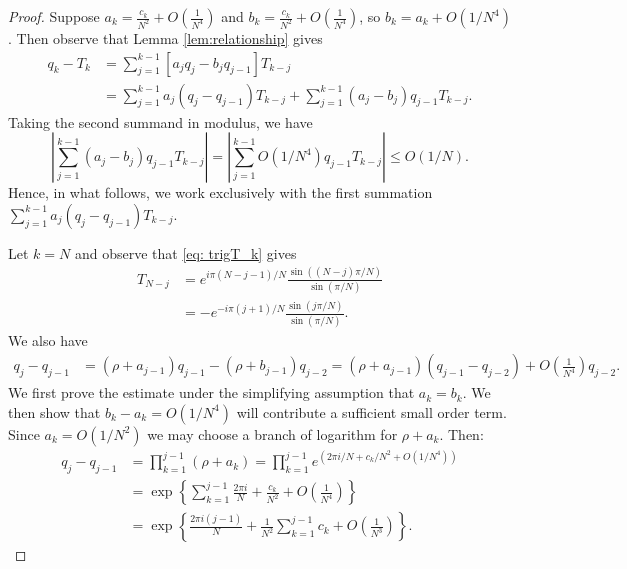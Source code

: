 \documentclass{amsart}
\theoremstyle{remark}
\theoremstyle{definition}
\newcommand{\lp}{\left(}
\newcommand{\rp}{\right)}
\begin{document}
\begin{proof}
	Suppose ${a}_k = \frac{c_k}{N^2} +O\lp \frac{1}{N^4}\rp$ and ${b}_k = \frac{c_k}{N^2} + O\lp \frac{1}{N^4}\rp$, so $b_k = a_k + O(1/N^4)$. 
	Then observe that Lemma \ref{lem:relationship} gives
	\begin{align*}
		q_k-T_k &= \sum_{j=1}^{k-1} [{a}_jq_j - {b}_jq_{j-1}] T_{k-j} \\
		&= \sum_{j=1}^{k-1} a_j(q_j-q_{j-1}) T_{k-j} + \sum_{j=1}^{k-1} (a_j-b_j)q_{j-1} T_{k-j}.
	\end{align*}
	Taking the second summand in modulus, we have
	\begin{equation*}
		\left|\sum_{j=1}^{k-1} (a_j-b_j)q_{j-1} T_{k-j}\right|=
        \left|\sum_{j=1}^{k-1} O(1/N^4)q_{j-1} T_{k-j} \right| \leq O(1/N). 
	\end{equation*}
	Hence, in what follows, we work exclusively with the first summation $\sum_{j=1}^{k-1} a_j(q_j-q_{j-1})T_{k-j}$.
	
	Let $k=N$ and observe that \eqref{eq: trigT_k} gives
    \begin{align*}
    T_{N-j}&=e^{i\pi(N-j-1)/N}\frac{\sin((N-j)\pi/N)}{\sin(\pi/N)}\\
    &=-e^{-i\pi(j+1)/N}\frac{\sin(j\pi/N)}{\sin(\pi/N)}.
    \end{align*}
	We also have 
	\begin{align*}
		q_j-q_{j-1} 
		&= (\rho+{a}_{j-1})q_{j-1} -(\rho+{b}_{j-1})q_{j-2} 
		= (\rho+{a}_{j-1})(q_{j-1}-q_{j-2}) + O\lp \frac{1}{N^4}\rp q_{j-2}.
\end{align*}
We first prove the estimate under the simplifying assumption that $a_k=b_k$. We then show that $b_k-a_k=O(1/N^4)$ will contribute a sufficient small order term. Since $a_k=O(1/N^2)$ we may choose a branch of logarithm for $\rho+a_k$. Then:
        \begin{align*}
         		q_j-q_{j-1} 
	 	&= \prod_{k=1}^{j-1} (\rho+{a}_{k}) 
		= \prod_{k=1}^{j-1} e^{(2\pi i/N + c_k/N^2 + O(1/N^4))}\\
	 	&= \exp\left\{\sum_{k=1}^{j-1} \frac{2\pi i}{N} + \frac{c_k}{N^2} + O\lp\frac{1}{N^4}\rp \right\} \\
		&= \exp\left\{ \frac{2\pi i(j-1)}{N} + \frac{1}{N^2}\sum_{k=1}^{j-1} c_k + O\lp\frac{1}{N^3}\rp \right\}.
	 \end{align*}


\end{proof}
\end{document}
